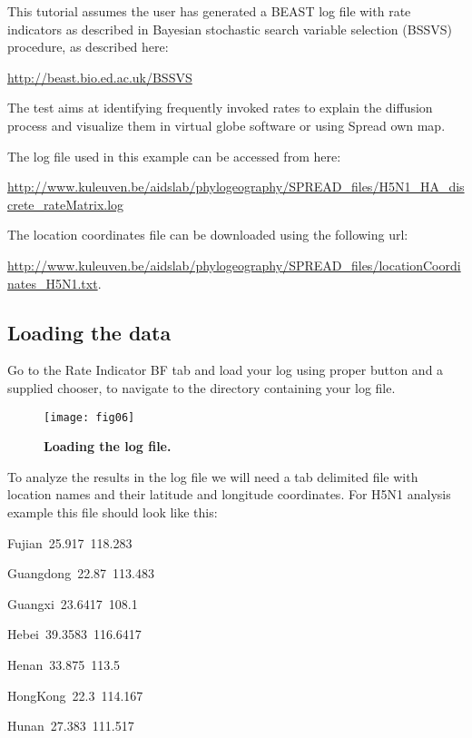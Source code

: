 This tutorial assumes the user has generated a BEAST log file with
rate indicators as described in Bayesian stochastic search variable
selection (BSSVS) procedure, as described here:

\url{http://beast.bio.ed.ac.uk/BSSVS} 

\noindent
The test aims at identifying frequently invoked rates to explain the
diffusion process and visualize them in virtual globe software or
using Spread own map. 

\noindent
The log file used in this example can be accessed from here:

\url{http://www.kuleuven.be/aidslab/phylogeography/SPREAD_files/H5N1_HA_discrete_rateMatrix.log}

\noindent
The location coordinates file can be downloaded using the following
url: 

\url{http://www.kuleuven.be/aidslab/phylogeography/SPREAD_files/locationCoordinates_H5N1.txt}.


\subsection{Loading the data}

Go to the Rate Indicator BF tab and load your log using proper button
and a supplied chooser, to navigate to the directory containing your
log file. 

\begin{figure}[H]
\begin{centering}
\texttt{[image: fig06]}
\caption{
{ \footnotesize 
{\bf Loading the log file.}
} %
}
\label{fig:06}
\par\end{centering}
\end{figure}

To analyze the results in the log file we will need a tab delimited
file with location names and their latitude and longitude coordinates.
For H5N1 analysis example this file should look like this:

\begin{lyxcode}
Fujian~25.917~118.283

Guangdong~22.87~113.483

Guangxi~23.6417~108.1

Hebei~39.3583~116.6417

Henan~33.875~113.5

HongKong~22.3~114.167

Hunan~27.383~111.517
\end{lyxcode}

